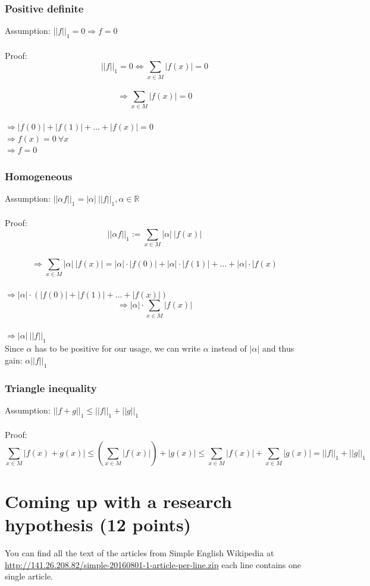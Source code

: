 \documentclass{WeSTassignment}
\begin{document}
\subsubsection*{Positive definite}
Assumption: $||f||_1 = 0 \Rightarrow f = 0$\\
\\
Proof:\\
\[||f||_1 =  0 \Leftrightarrow \sum_{x \in M}{|f(x)|} = 0\] \\
\[ \Rightarrow \sum_{x \in M} {|f(x)|} = 0\] \\
$ \Rightarrow| f(0)| + |f(1)| + ... + |f(x)| = 0$ \\
$ \Rightarrow f(x) = 0~\forall x$ \\
$\Rightarrow f = 0$

\subsubsection*{Homogeneous}
Assumption: $||\alpha f||_1 = |\alpha|~||f||_1, \alpha \in \mathbb{R}$\\
\\
Proof:\\
\[||\alpha f||_1 := \sum_{x \in M}{|\alpha|~|f(x)|}\]\\
\[\Rightarrow \sum_{x \in M}{|\alpha|~|f(x)|} = |\alpha| \cdot |f(0)| + |\alpha| \cdot |f(1)| + ... + |\alpha| \cdot |f(x)\] \\
$\Rightarrow |\alpha| \cdot ( |f(0)| + |f(1)| + ... + |f(x)|)$ \\
\[\Rightarrow |\alpha| \cdot \sum_{x \in M}{ |f(x)|}\] \\
$\Rightarrow |\alpha|~||f||_1$\\
Since $\alpha$ has to be positive for our usage, we can write $\alpha$ instead of $|\alpha|$ and thus gain: $\alpha ||f||_1$
\newpage
\subsubsection*{Triangle inequality}
Assumption: $||f + g||_1 \leq ||f||_1 + ||g||_1$\\
\\
Proof: \\
\[ \sum_{x \in M}{|f(x) + g(x)|} \leq (\sum_{x \in M} {|f(x)|})  + |g(x)| \leq \sum_{x \in M} {|f(x)|} +  \sum_{x \in M} {|g(x)|} = ||f||_1 + ||g||_1\]



\section{Coming up with a research hypothesis (12 points)}
You can find all the text of the articles from Simple English Wikipedia at \url{http://141.26.208.82/simple-20160801-1-article-per-line.zip} each line contains one single article. 
\end{document}
